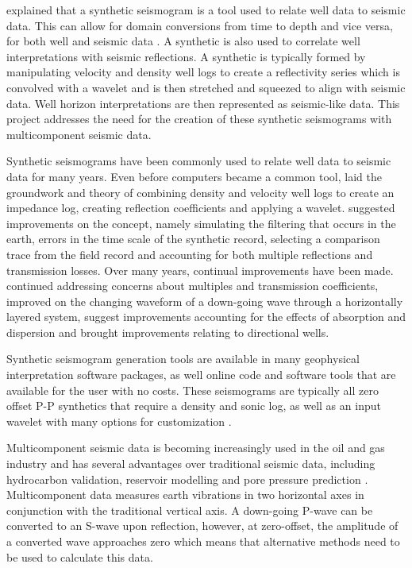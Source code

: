 \documentclass[12pt]{article}
\begin{document}
	\cite{peck1985} explained that a synthetic seismogram is a tool used to relate well data to seismic data. This can allow for domain conversions from time to depth and vice versa, for both well and seismic data . A synthetic is also used to correlate well interpretations with seismic reflections. A synthetic is typically formed by manipulating velocity and density well logs to create a reflectivity series which is convolved with a wavelet and is then stretched and squeezed to align with seismic data. Well horizon interpretations are then represented as seismic-like data. This project addresses the need for the creation of these synthetic seismograms with multicomponent seismic data.
	
	Synthetic seismograms have been commonly used to relate well data to seismic data for many years. Even before computers became a common tool, \cite{peterson1955} laid the groundwork and theory of combining density and velocity well logs to create an impedance log, creating reflection coefficients and applying a wavelet. \cite{anstey1960} suggested improvements on the concept, namely simulating the filtering that occurs in the earth, errors in the time scale of the synthetic record, selecting a comparison trace from the field record and accounting for both multiple reflections and transmission losses. Over many years, continual improvements have been made. \cite{wuensche1960} continued addressing concerns about multiples and transmission coefficients, \cite{robinson1977} improved on the changing waveform of a down-going wave through a horizontally layered system, \cite{ganley1981} suggest improvements accounting for the effects of absorption and dispersion and \cite{lewis1989} brought improvements relating to directional wells. 
	
	Synthetic seismogram generation tools are available in many geophysical interpretation software packages, as well online code and software tools that are available for the user with no costs. These seismograms are typically all zero offset P-P synthetics that require a density and sonic log, as well as an input wavelet with many options for customization \citep{peck1985}.	
	
	Multicomponent seismic data is becoming increasingly used in the oil and gas industry and has several advantages over traditional seismic data, including hydrocarbon validation, reservoir modelling and pore pressure prediction \citep{barkved2004}. Multicomponent data measures earth vibrations in two horizontal axes in conjunction with the traditional vertical axis. A down-going P-wave can be converted to an S-wave upon reflection, however, at zero-offset, the amplitude of a converted wave approaches zero \citep{dankbaar1985} which means that alternative methods need to be used to calculate this data.
 
\end{document}
